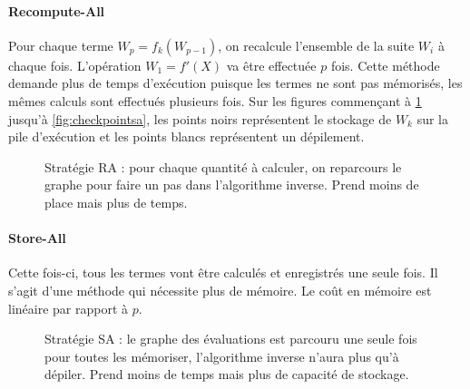  \paragraph{Recompute-All}
Pour chaque terme $W_p=f_k(W_{p-1})$, on recalcule l'ensemble de la suite $W_i$ \`a chaque fois. L'op\'eration $W_1 =f'(X)$ va être effectu\'ee $p$ fois.
 Cette m\'ethode demande plus de temps d'ex\'ecution puisque les termes ne sont pas m\'emoris\'es, les mêmes 
calculs sont effectu\'es plusieurs fois. {\co Sur les figures commençant \`a \ref{fig:ra} jusqu'\`a \ref{fig:checkpointsa}}, les points noirs repr\'esentent le stockage de $W_k$ sur la pile
d'ex\'ecution et les points blancs repr\'esentent un d\'epilement.


\begin{figure}
\caption{Strat\'egie RA : pour chaque quantit\'e \`a calculer, on reparcours le graphe pour faire un pas dans l'algorithme inverse. Prend moins de place mais
plus de temps.}
\label{fig:ra}
\end{figure}


 \paragraph{Store-All}
Cette fois-ci, tous les termes vont être calcul\'es et enregistr\'es une seule fois. Il s'agit d'une
m\'ethode qui n\'ecessite plus de m\'emoire. Le co\^ut en m\'emoire est lin\'eaire par rapport \`a $p$.


\begin{figure}
\caption{Strat\'egie SA : le graphe des \'evaluations est parcouru une seule fois pour toutes les m\'emoriser, l'algorithme inverse n'aura plus qu'\`a d\'epiler. Prend
moins de temps mais plus de capacit\'e de stockage.}
\begin{center}




\end{center}
\label{fig:sa}
\end{figure}



